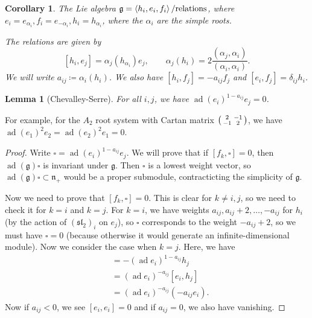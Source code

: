 \documentclass[leqno, openany]{memoir}
\newtheorem{cor}[thm]{Corollary}
\newtheorem{lem}[thm]{Lemma}
\theoremstyle{definition}
\theoremstyle{remark}
\theoremstyle{plain}
\theoremstyle{definition}
\theoremstyle{remark}
\newcommand{\mf}[1]{\mathfrak{#1}}
\DeclareMathOperator{\ad}{ad}
\begin{document}
\begin{cor}
    The Lie algebra $\mf{g} = \ev{h_i, e_i, f_i} / \text{relations}$, where $e_i = e_{\alpha_i}, f_i = e_{-\alpha_i}, h_i = h_{\alpha_i}$, where the $\alpha_i$ are the simple roots.

    The relations are given by
    \[ [h_i, e_j] = \alpha_j(h_{\alpha_i}) e_j, \qquad \alpha_j(h_i) = 2 \frac{(\alpha_j, \alpha_i)}{(\alpha_i, \alpha_i)}. \]
    We will write $a_{ij} \coloneqq \alpha_i(h_i)$. We also have $[h_i, f_j] = - a_{ij} f_j$ and $[e_i, f_j] = \delta_{ij} h_i$.
\end{cor}

\begin{lem}[Chevalley-Serre]
    For all $i,j$, we have ${\ad(e_i)}^{1-a_{ij}} e_j = 0$.
\end{lem}

For example, for the $A_2$ root system with Cartan matrix $\begin{psmallmatrix} 2 & -1 \\ -1 & 2 \end{psmallmatrix}$, we have ${\ad(e_1)}^2 e_2 = {\ad(e_2)}^2 e_1 = 0$.

\begin{proof}
    Write $\square = {\ad(e_i)}^{1-a_{ij}} e_j$. We will prove that if $[f_k, \square] = 0$, then $\ad(\mf{g}) \square$ is invariant under $\mf{g}$. Then $\square$ is a lowest weight vector, so $\ad(\mf{g}) \square \subset \mf{n}_+$ would be a proper submodule, contracticting the simplicity of $\mf{g}$.

    Now we need to prove that $[f_k, \square] = 0$. This is clear for $k \neq i,j$, so we need to check it for $k=i$ and $k=j$. For $k=i$, we have weights $a_{ij}, a_{ij}+2, \ldots, -a_{ij}$ for $h_i$ (by the action of ${(\mf{sl}_2)}_i$ on $e_j$), so $\square$ corresponds to the weight $-a_{ij} + 2$, so we must have $\square = 0$ (because otherwise it would generate an infinite-dimensional module). Now we consider the case when $k=j$. Here, we have
    \begin{align*}
        [f_j, {(\ad e_i)}^{1-a_{ij}} e_j] &= - {(\ad e_i)}^{1-a_{ij}} h_j \\
                                          &= {(\ad e_i)}^{-a_{ij}} [e_i, h_j] \\
                                          &= {(\ad e_i)}^{-a_{ij}} (-a_{ij} e_i).
    \end{align*}
    Now if $a_{ij} < 0$, we see $[e_i, e_i] = 0$ and if $a_{ij} = 0$, we also have vanishing.
\end{proof}
\end{document}
